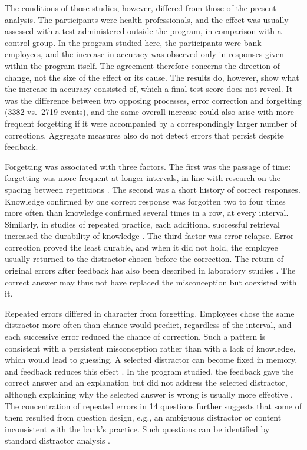 \documentclass[11pt]{article}
\newcommand{\NCorrections}{3382}
\newcommand{\NForgetting}{2719}
\newcommand{\PersistTopItems}{14}
\begin{document}
The conditions of those studies, however, differed from those of the present analysis. The
participants were health professionals, and the effect was usually assessed with a test administered
outside the program, in comparison with a control group. In the program studied here, the participants
were bank employees, and the increase in accuracy was observed only in responses given within the
program itself. The agreement therefore concerns the direction of change, not the size of the effect or
its cause. The results do, however, show what the increase in accuracy consisted of, which a final test
score does not reveal. It was the difference between two opposing processes, error correction and
forgetting (\NCorrections{} vs.\ \NForgetting{} events), and the same overall increase could also
arise with more frequent forgetting if it were accompanied by a correspondingly larger number of
corrections. Aggregate measures also do not detect errors that persist despite feedback.

Forgetting was associated with three factors. The first was the passage of time: forgetting was more
frequent at longer intervals, in line with research on the spacing between repetitions
\citep{cepeda2006}. The second was a short history of correct responses. Knowledge confirmed by one
correct response was forgotten two to four times more often than knowledge confirmed several times in
a row, at every interval.
Similarly, in studies of repeated practice, each additional successful retrieval increased the
durability of knowledge \citep{rawson2013}. The third factor was error relapse. Error correction proved
the least durable, and when it did not hold, the employee usually returned to the distractor chosen
before the correction. The return of original errors after feedback has also been described in
laboratory studies \citep{butler2011}. The correct answer may thus not have replaced the misconception
but coexisted with it.

Repeated errors differed in character from forgetting. Employees chose the same distractor more often
than chance would predict, regardless of the interval, and each successive error reduced the chance of
correction. Such a pattern is consistent with a persistent misconception rather than with a lack of
knowledge, which would lead to guessing. A selected distractor can become fixed in memory, and feedback
reduces this effect \citep{butler2008}. In the program studied, the feedback gave the correct answer
and an explanation but did not address the selected distractor, although explaining why the selected
answer is wrong is usually more effective \citep{shute2008}. The concentration of repeated errors in
\PersistTopItems{} questions further suggests that some of them resulted from question design, e.g.,
an ambiguous distractor or content inconsistent with the bank's practice. Such questions can be
identified by standard distractor analysis \citep{gierl2017}.
\end{document}
